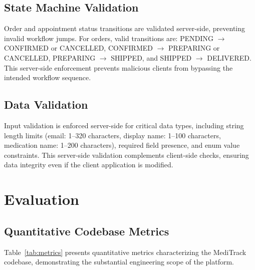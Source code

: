 \documentclass[journal,onecolumn,web]{ieeecolor}
\begin{document}
\subsection{State Machine Validation}
Order and appointment status transitions are validated
server-side, preventing invalid workflow jumps. For
orders, valid transitions are: PENDING $\rightarrow$
CONFIRMED or CANCELLED, CONFIRMED $\rightarrow$
PREPARING or CANCELLED, PREPARING $\rightarrow$
SHIPPED, and SHIPPED $\rightarrow$ DELIVERED. This
server-side enforcement prevents malicious clients
from bypassing the intended workflow sequence.

\subsection{Data Validation}
Input validation is enforced server-side for critical
data types, including string length limits (email:
1--320 characters, display name: 1--100 characters,
medication name: 1--200 characters), required field
presence, and enum value constraints. This server-side
validation complements client-side checks, ensuring
data integrity even if the client application is
modified.


\section{Evaluation}
\label{sec:evaluation}

\subsection{Quantitative Codebase Metrics}
Table~\ref{tab:metrics} presents quantitative metrics
characterizing the MediTrack codebase, demonstrating
the substantial engineering scope of the platform.
\end{document}
